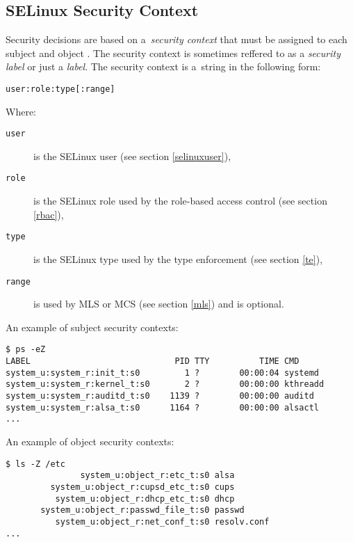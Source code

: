 \subsection{SELinux Security Context}
\label{context}
Security decisions are based on a~\emph{security context} that must be assigned
to each subject and object \cite[pp.~27--28]{tsn}. The security context is
sometimes reffered to as a \emph{security label} or just a \emph{label}. The
security context is a~string in the following form:
\begin{lstlisting}
user:role:type[:range]
\end{lstlisting}
Where:
\begin{description}
    \item [\texttt{user}] is the SELinux user (see section \ref{selinuxuser}),
    \item [\texttt{role}] is the SELinux role used by the role-based access
        control (see section \ref{rbac}),
    \item [\texttt{type}] is the SELinux type used by the type enforcement (see
        section \ref{te}),
    \item [\texttt{range}] is used by MLS or MCS (see section \ref{mls}) and is
        optional.
\end{description}

An example of subject security contexts:
\begin{lstlisting}
$ ps -eZ
LABEL                             PID TTY          TIME CMD
system_u:system_r:init_t:s0         1 ?        00:00:04 systemd
system_u:system_r:kernel_t:s0       2 ?        00:00:00 kthreadd
system_u:system_r:auditd_t:s0    1139 ?        00:00:00 auditd
system_u:system_r:alsa_t:s0      1164 ?        00:00:00 alsactl
...
\end{lstlisting}

An example of object security contexts:
\begin{lstlisting}
$ ls -Z /etc
               system_u:object_r:etc_t:s0 alsa
         system_u:object_r:cupsd_etc_t:s0 cups
          system_u:object_r:dhcp_etc_t:s0 dhcp
       system_u:object_r:passwd_file_t:s0 passwd
          system_u:object_r:net_conf_t:s0 resolv.conf
...
\end{lstlisting}

